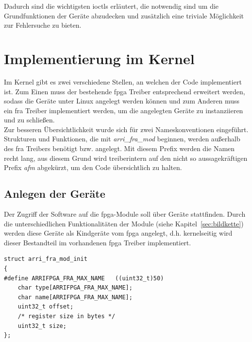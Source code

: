 Dadurch sind die wichtigsten \ac{ioctl}s erläutert, die notwendig sind um die Grundfunktionen der Geräte abzudecken und zusätzlich eine triviale Möglichkeit zur Fehlersuche zu bieten.

\section{Implementierung im Kernel}\label{sec:kernel}
Im Kernel gibt es zwei verschiedene Stellen, an welchen der Code implementiert ist. Zum Einen muss der bestehende \ac{fpga} Treiber entsprechend erweitert werden, sodass die Geräte unter Linux angelegt werden können und zum Anderen muss ein \ac{fra} Treiber implementiert werden, um die angelegten Geräte zu instanziieren und zu schließen. \\

Zur besseren Übersichtlichkeit wurde sich für zwei Nameskonventionen eingeführt. Strukturen und Funktionen, die mit \textit{arri\_fra\_mod} beginnen, werden außerhalb des \ac{fra} Treibers benötigt bzw. angelegt. Mit diesem Prefix werden die Namen recht lang, aus diesem Grund wird treiberintern auf den nicht so aussagekräftigen Prefix \textit{afm} abgekürzt, um den Code übersichtlich zu halten.




\subsection{Anlegen der Geräte}
Der Zugriff der Software auf die \ac{fpga}-Module soll über Geräte stattfinden. Durch die unterschiedlichen Funktionalitäten der Module (siehe Kapitel~\ref{sec:bildkette}) werden diese Geräte als Kindgeräte vom \ac{fpga} angelegt, d.h. kernelseitig wird dieser Bestandteil im vorhandenen \ac{fpga} Treiber implementiert. 

\begin{lstfloat}
\begin{lstlisting}
struct arri_fra_mod_init 
{
#define ARRIFPGA_FRA_MAX_NAME   ((uint32_t)50)
	char type[ARRIFPGA_FRA_MAX_NAME];
	char name[ARRIFPGA_FRA_MAX_NAME];
	uint32_t offset;
	/* register size in bytes */
	uint32_t size;
};
\end{lstlisting}
\end{lstfloat}


